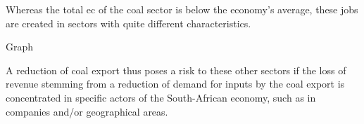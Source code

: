 \documentclass[12pt,english]{article}
\begin{document}
Whereas the total ec of the coal sector is below the economy's average, these jobs are created in sectors with quite different characteristics. 


Graph 

A reduction of coal export thus poses a risk to these other sectors if the loss of revenue stemming from a reduction of demand for inputs by the coal export is concentrated in specific actors of the South-African economy, such as in companies and/or geographical areas.




\end{document}
